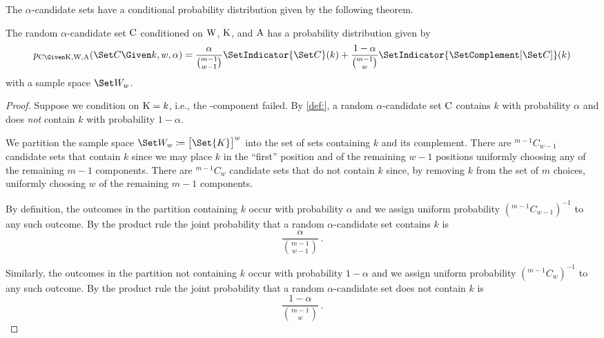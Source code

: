 \documentclass[../main.tex]{subfiles}
\begin{document}
The $\alpha$-candidate sets have a conditional probability distribution given by the following theorem.
\begin{theorem}
The random $\alpha$-candidate set $\mathrm{C}$ conditioned on $\mathrm{W}$, $\mathrm{K}$, and $\mathrm{A}$ has a probability distribution given by
\begin{equation}
\label{eq:rvcand_given_k_w_a}
	\pmf_{\rvcand \Given \RV{K}, \RV{W}, \RV{A}}(\cand \Given k, w, \alpha) = \frac{\alpha}{\binom{m-1}{w-1}} \SetIndicator{\cand}(k) + \frac{1-\alpha}{\binom{m-1}{w}} \SetIndicator{\SetComplement[\cand]}(k)
\end{equation}
with a sample space $\candsw{w}$.
\end{theorem}
\begin{proof}
	Suppose we condition on $\mathrm{K}=k$, i.e., the \kth-component failed.
	By \cref{def:}, a random $\alpha$-candidate set $\mathrm{C}$ contains $k$ with probability $\alpha$ and does \emph{not} contain $k$ with probability $1-\alpha$.	
	
	We partition the sample space $\candsw{w} \coloneqq \left[\Set{K}\right]^w$ into the set of sets containing $k$ and its complement.
	There are $^{m-1}C_{w-1}$ candidate sets that contain $k$ since we may place $k$ in the ``first'' position and of the remaining $w-1$ positions uniformly choosing any of the remaining $m-1$ components.
	There are $^{m-1}C_w$ candidate sets that do not contain $k$ since, by removing $k$ from the set of $m$ choices, uniformly choosing $w$ of the remaining $m-1$ components.

	By definition, the outcomes in the partition containing $k$ occur with probability $\alpha$ and we assign uniform probability $(^{m-1}C_{w-1})^{-1}$ to any such outcome.
	By the product rule the joint probability that a random $\alpha$-candidate set contains $k$ is
	\begin{equation}
		\frac{\alpha}{\binom{m-1}{w-1}}\,.
	\end{equation}
	
	Similarly, the outcomes in the partition not containing $k$ occur with probability $1-\alpha$ and we assign uniform probability $(^{m-1}C_w)^{-1}$ to any such outcome.
	By the product rule the joint probability that a random $\alpha$-candidate set does not contain $k$ is
	\begin{equation}
		\frac{1-\alpha}{\binom{m-1}{w}}\,.
	\end{equation}
\end{proof}
\end{document}
